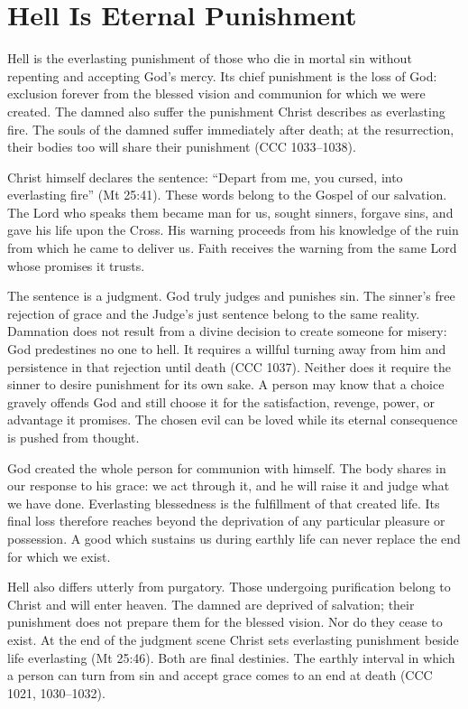 \section{Hell Is Eternal Punishment}

Hell is the everlasting punishment of those who die in mortal sin without repenting and accepting God's mercy. Its chief punishment is the loss of God: exclusion forever from the blessed vision and communion for which we were created. The damned also suffer the punishment Christ describes as everlasting fire. The souls of the damned suffer immediately after death; at the resurrection, their bodies too will share their punishment (CCC 1033--1038).

Christ himself declares the sentence: ``Depart from me, you cursed, into everlasting fire'' (Mt 25:41). These words belong to the Gospel of our salvation. The Lord who speaks them became man for us, sought sinners, forgave sins, and gave his life upon the Cross. His warning proceeds from his knowledge of the ruin from which he came to deliver us. Faith receives the warning from the same Lord whose promises it trusts.

The sentence is a judgment. God truly judges and punishes sin. The sinner's free rejection of grace and the Judge's just sentence belong to the same reality. Damnation does not result from a divine decision to create someone for misery: God predestines no one to hell. It requires a willful turning away from him and persistence in that rejection until death (CCC 1037). Neither does it require the sinner to desire punishment for its own sake. A person may know that a choice gravely offends God and still choose it for the satisfaction, revenge, power, or advantage it promises. The chosen evil can be loved while its eternal consequence is pushed from thought.

God created the whole person for communion with himself. The body shares in our response to his grace: we act through it, and he will raise it and judge what we have done. Everlasting blessedness is the fulfillment of that created life. Its final loss therefore reaches beyond the deprivation of any particular pleasure or possession. A good which sustains us during earthly life can never replace the end for which we exist.

Hell also differs utterly from purgatory. Those undergoing purification belong to Christ and will enter heaven. The damned are deprived of salvation; their punishment does not prepare them for the blessed vision. Nor do they cease to exist. At the end of the judgment scene Christ sets everlasting punishment beside life everlasting (Mt 25:46). Both are final destinies. The earthly interval in which a person can turn from sin and accept grace comes to an end at death (CCC 1021, 1030--1032).

